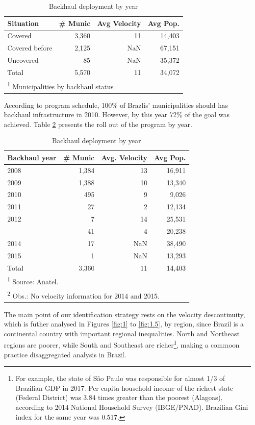 \documentclass[12pt,]{article}
\let\rmarkdownfootnote\footnote%
\def\footnote{\protect\rmarkdownfootnote}
\begin{document}
\begin{table}[!h]

\caption{\label{tab:desc_back}Backhaul deployment by year}
\centering
\begin{tabular}{lrrr}
\toprule
Situation & \# Munic & Avg Velocity & Avg Pop.\\
\midrule
Covered & 3,360 & 11 & 14,403\\
Covered before & 2,125 & NaN & 67,151\\
Uncovered & 85 & NaN & 35,372\\
Total & 5,570 & 11 & 34,072\\
\bottomrule
\multicolumn{4}{l}{\textsuperscript{1} Municipalities by backhaul status}\\
\end{tabular}
\end{table}

According to program schedule, 100\% of Brazlis' municipalities should
has backhaul infrastructure in 2010. However, by this year 72\% of the
goal was achieved. Table \ref{tab:backhaul_implementation} presents the
roll out of the program by year.

\begin{table}[!h]

\caption{\label{tab:backhaul_implementation}Backhaul deployment by year}
\centering
\begin{tabular}{lrrr}
\toprule
Backhaul year & \# Munic & Avg. Velocity & Avg Pop.\\
\midrule
2008 & 1,384 & 13 & 16,911\\
2009 & 1,388 & 10 & 13,340\\
2010 & 495 & 9 & 9,026\\
2011 & 27 & 2 & 12,134\\
2012 & 7 & 14 & 25,531\\
\addlinespace
2013 & 41 & 4 & 20,238\\
2014 & 17 & NaN & 38,490\\
2015 & 1 & NaN & 13,293\\
Total & 3,360 & 11 & 14,403\\
\bottomrule
\multicolumn{4}{l}{\textsuperscript{1} Source: Anatel.}\\
\multicolumn{4}{l}{\textsuperscript{2} Obs.: No velocity information for 2014 and 2015.}\\
\end{tabular}
\end{table}

The main point of our identification strategy rests on the velocity
descontinuity, which is futher analysed in Figures \ref{fig:1} to
\ref{fig:1.5}, by region, since Brazil is a continental country with
important regional inequalities. North and Northeast regions are poorer,
while South and Southeast are richer\footnote{For example, the state of
  São Paulo was responsible for almost 1/3 of Brazilian GDP in 2017. Per
  capita household income of the richest state (Federal District) was
  3.84 times greater than the poorest (Alagoas), according to 2014
  National Household Survey (IBGE/PNAD). Brazilian Gini index for the
  same year was 0.517.}, making a commoon practice disaggregated
analysis in Brazil.
\end{document}

